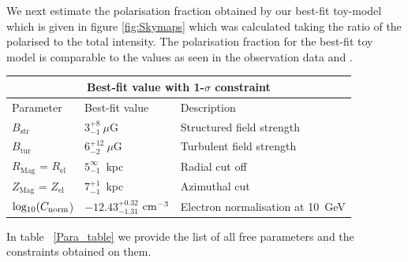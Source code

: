 \documentclass[12pt, a4 paper]{article}
\begin{document}
We next estimate the polarisation fraction obtained by our best-fit toy-model which is given in figure \ref{fig:Skymaps} which was calculated taking the ratio of the polarised to the total intensity. The polarisation fraction for the best-fit toy model is comparable to the values as seen in the observation data \cite{Carretti_2013} and \cite{WMAP_Page}.

\label{Para_table}
\begin{center}
\begin{tabular}{ |p{}|p{4.5cm}|p{6.5cm}|  }
\hline
\multicolumn{3}{|c|}{Best-fit value with 1-$\sigma$ constraint} \\
\hline
Parameter & Best-fit value &Description \\
\hline
\hline
$B_{\mathrm{str}} $& $3_{-1}^{+8} ~ \mu$G & Structured field strength \\
\hline
$B_{\mathrm{tur}} $& $ 6_{-2}^{+12} ~\mu$G & Turbulent field strength\\
\hline
$R_{\mathrm{Mag}}$ = $R_{\mathrm{el}}$ & $5_{-1}^{\infty}$~kpc & Radial cut off \\
\hline
$Z_{\mathrm{Mag}}$ = $Z_{\mathrm{el}}$ & $7_{-1}^{+1}$~kpc & Azimuthal cut\\
\hline
${\rm{log_{10}}}(C_{\rm norm}$) & ${-12.43}_{{-1.31}}^{{+0.32}}$ ${\rm cm}^{-3}$ & Electron normalisation at 10~GeV\\
\hline
\end{tabular}

\end{center}


In table ~\ref{Para_table} we provide the list of all free parameters and the constraints obtained on them.
\newline
\end{document}
